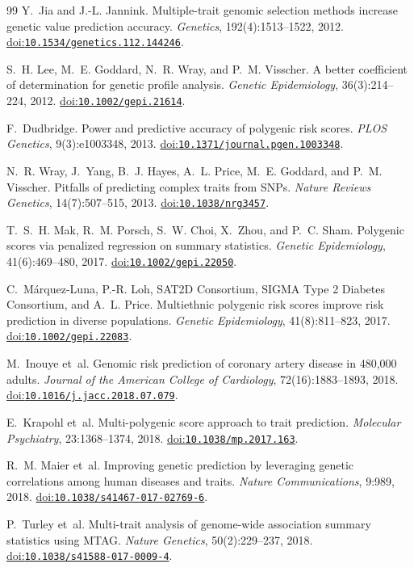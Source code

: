\documentclass[11pt,a4paper]{article}
\newcommand{\doi}[1]{\href{https://doi.org/#1}{doi:\allowbreak\texttt{#1}}}
\begin{document}
\begin{thebibliography}{99}
Y.~Jia and J.-L. Jannink.
\newblock Multiple-trait genomic selection methods increase genetic
value prediction accuracy.
\newblock \emph{Genetics}, 192(4):1513--1522, 2012.
\newblock \doi{10.1534/genetics.112.144246}.

S.~H. Lee, M.~E. Goddard, N.~R. Wray, and P.~M. Visscher.
\newblock A better coefficient of determination for genetic profile
analysis.
\newblock \emph{Genetic Epidemiology}, 36(3):214--224, 2012.
\newblock \doi{10.1002/gepi.21614}.

F.~Dudbridge.
\newblock Power and predictive accuracy of polygenic risk scores.
\newblock \emph{PLOS Genetics}, 9(3):e1003348, 2013.
\newblock \doi{10.1371/journal.pgen.1003348}.

N.~R. Wray, J.~Yang, B.~J. Hayes, A.~L. Price, M.~E. Goddard, and
P.~M. Visscher.
\newblock Pitfalls of predicting complex traits from {SNP}s.
\newblock \emph{Nature Reviews Genetics}, 14(7):507--515, 2013.
\newblock \doi{10.1038/nrg3457}.

T.~S.~H. Mak, R.~M. Porsch, S.~W. Choi, X.~Zhou, and P.~C. Sham.
\newblock Polygenic scores via penalized regression on summary
statistics.
\newblock \emph{Genetic Epidemiology}, 41(6):469--480, 2017.
\newblock \doi{10.1002/gepi.22050}.

C.~M\'arquez-Luna, P.-R. Loh, {SAT2D Consortium}, {SIGMA Type 2
Diabetes Consortium}, and A.~L. Price.
\newblock Multiethnic polygenic risk scores improve risk prediction
in diverse populations.
\newblock \emph{Genetic Epidemiology}, 41(8):811--823, 2017.
\newblock \doi{10.1002/gepi.22083}.

M.~Inouye et~al.
\newblock Genomic risk prediction of coronary artery disease in
480{,}000 adults.
\newblock \emph{Journal of the American College of Cardiology},
72(16):1883--1893, 2018.
\newblock \doi{10.1016/j.jacc.2018.07.079}.

E.~Krapohl et~al.
\newblock Multi-polygenic score approach to trait prediction.
\newblock \emph{Molecular Psychiatry}, 23:1368--1374, 2018.
\newblock \doi{10.1038/mp.2017.163}.

R.~M. Maier et~al.
\newblock Improving genetic prediction by leveraging genetic
correlations among human diseases and traits.
\newblock \emph{Nature Communications}, 9:989, 2018.
\newblock \doi{10.1038/s41467-017-02769-6}.

P.~Turley et~al.
\newblock Multi-trait analysis of genome-wide association summary
statistics using {MTAG}.
\newblock \emph{Nature Genetics}, 50(2):229--237, 2018.
\newblock \doi{10.1038/s41588-017-0009-4}.


\end{thebibliography}
\end{document}
